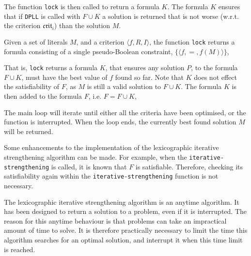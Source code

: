 The function \texttt{lock} is then called to return a formula $K$.
The formula $K$ ensures that if \texttt{DPLL} is called with $F \cup K$ a solution is returned that is not worse (w.r.t. the criterion $\mathfrak{crit}_i$) than the solution $M$. 
\begin{defs}
Given a set of literals $M$, and a criterion $\langle f, R, I \rangle$,
the function \texttt{lock} returns a formula consisting of a single pseudo-Boolean constraint, $\{ \langle f,=,f(M) \rangle \}$,
\end{defs}
That is, \texttt{lock} returns a formula $K$,
that ensures any solution $P$, to the formula $F \cup K$, must have the best value of $f$ found so far.
Note that $K$ does not effect the satisfiability of $F$, as $M$ is still a valid solution to $F \cup K$.
The formula $K$ is then added to the formula $F$, i.e. $F = F \cup K$,

The main loop will iterate until either all the criteria have been optimised, or the function is interrupted.
When the loop ends, the currently best found solution $M$ will be returned.

Some enhancements to the implementation of the lexicographic iterative strengthening algorithm can be made.
For example, when the \texttt{iterative-strengthening} is called, it is known that $F$ is satisfiable. 
Therefore, checking its satisfiability again within the \texttt{iterative-strengthening} function is not necessary.

The lexicographic iterative strengthening algorithm is an anytime algorithm.
It has been designed to return a solution to a \modelimpl problem, even if it is interrupted.
The reason for this anytime behaviour is that \modelimpl problems can take an impractical amount of time to solve.
It is therefore practically necessary to limit the time this algorithm searches for an optimal solution, 
and interrupt it when this time limit is reached. 

